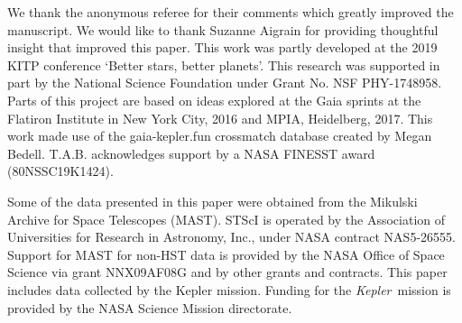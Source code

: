 \documentclass{aastex63}
\newcommand{\kepler}{{\it Kepler}}
\newcommand{\Kepler}{{\it Kepler}}
\newcommand{\vz}{$v_{\bf z}$}
\newcommand{\vb}{$v_{\bf b}$}
\newcommand{\sigmavb}{$\sigma_{v{\bf b}}$}
\begin{document}
\begin{itemize}

\end{itemize}

We thank the anonymous referee for their comments which greatly improved the
manuscript.
We would like to thank Suzanne Aigrain for providing thoughtful insight that
improved this paper.
This work was partly developed at the 2019 KITP conference `Better stars,
better planets'.
This research was supported in part by the National Science Foundation under
Grant No. NSF PHY-1748958.
Parts of this project are based on ideas explored at the Gaia sprints at the
Flatiron Institute in New York City, 2016 and MPIA, Heidelberg, 2017.
This work made use of the gaia-kepler.fun crossmatch database created by Megan
Bedell.
T.A.B. acknowledges support by a NASA FINESST award (80NSSC19K1424).

Some of the data presented in this paper were obtained from the Mikulski
Archive for Space Telescopes (MAST).
STScI is operated by the Association of Universities for Research in
Astronomy, Inc., under NASA contract NAS5-26555.
Support for MAST for non-HST data is provided by the NASA Office of Space
Science via grant NNX09AF08G and by other grants and contracts.
This paper includes data collected by the Kepler mission. Funding for the
\Kepler\ mission is provided by the NASA Science Mission directorate.
\end{document}
